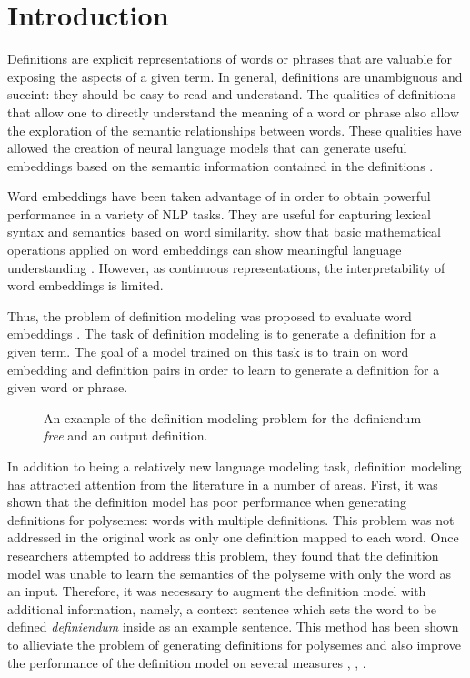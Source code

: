 \section{Introduction}
Definitions are explicit representations of words or phrases that are valuable
for exposing the aspects of a given term. In general, definitions are
unambiguous and succint: they should be easy to read and understand. The
qualities of definitions that allow one to directly understand the meaning of a
word or phrase also allow the exploration of the semantic relationships between
words. These qualities have allowed the creation of neural language models that
can generate useful embeddings based on the semantic information contained in
the definitions \cite{hill_learning_2016, bosc_auto_2018}.

Word embeddings have been taken advantage of in order to obtain powerful
performance in a variety of NLP tasks. They are useful for capturing lexical
syntax and semantics based on word similarity.
\citeauthor{mikolov_distributed_2013} show that basic mathematical operations
applied on word embeddings can show meaningful language understanding
\cite{mikolov_distributed_2013}. However, as continuous representations, the
interpretability of word embeddings is limited.

Thus, the problem of definition modeling was proposed to evaluate word
embeddings \cite{noraset_definition_2016}. The task of definition modeling is to
generate a definition for a given term. The goal of a model trained on this task
is to train on word embedding and definition pairs in order to learn to generate
a definition for a given word or phrase.

\begin{figure}
    \centering
    
    \caption{An example of the definition modeling problem for the definiendum
        \textit{free} and an output definition.}
\end{figure}

In addition to being a relatively new language modeling task, definition
modeling has attracted attention from the literature in a number of areas.
First, it was shown that the definition model has poor performance when
generating definitions for polysemes: words with multiple definitions. This
problem was not addressed in the original work as only one definition mapped to
each word. Once researchers attempted to address this problem, they found that
the definition model was unable to learn the semantics of the polyseme with only
the word as an input. Therefore, it was necessary to augment the definition
model with additional information, namely, a context sentence which sets the
word to be defined \textit{definiendum} inside as an example sentence. This
method has been shown to allieviate the problem of generating definitions for
polysemes and also improve the performance of the definition model on several
measures \cite{gadetsky_conditional_2018}, \cite{mickus_mark_2019},
\cite{bevilacqua_generationary_2020}.
